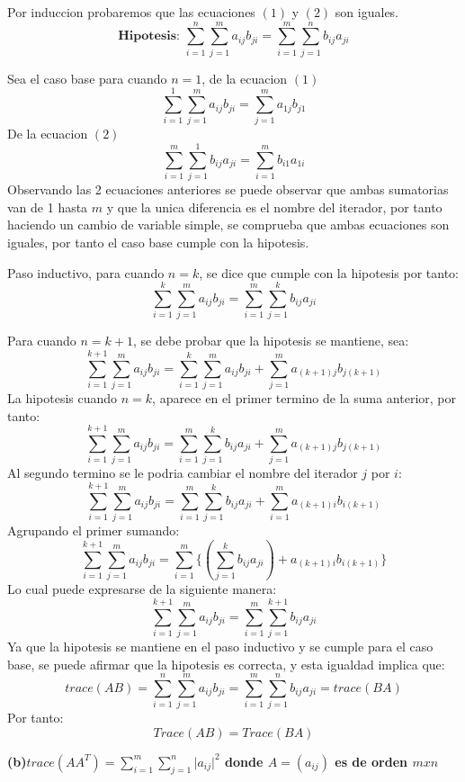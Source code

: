 \documentclass[12pt]{article}
\begin{document}
    Por induccion probaremos que las ecuaciones $(1)$ y $(2)$ son iguales.
    \[\textbf{Hipotesis: }\sum_{i=1}^n\sum_{j=1}^m a_{ij}b_{ji} = \sum_{i=1}^m\sum_{j=1}^n b_{ij}a_{ji}\]
    
    Sea el caso base para cuando $n = 1$, de la ecuacion $(1)$
    \[
    	\sum_{i=1}^1\sum_{j=1}^m a_{ij}b_{ji} = \sum_{j=1}^m a_{1j}b_{j1}  
    \]
    De la ecuacion $(2)$
    \[
    	\sum_{i=1}^m\sum_{j=1}^1 b_{ij}a_{ji} = \sum_{i=1}^m b_{i1}a_{1i}
    \]
    Observando las 2 ecuaciones anteriores se puede observar que ambas sumatorias van de 1 hasta $m$ y que la unica diferencia es el nombre del iterador, por tanto haciendo un cambio de variable simple, se comprueba que ambas ecuaciones son iguales, por tanto el caso base cumple con la hipotesis.
    
    
    Paso inductivo, para cuando $n = k$, se dice que cumple con la hipotesis por tanto:
    \[
    	\sum_{i=1}^k\sum_{j=1}^m a_{ij}b_{ji} = \sum_{i=1}^m\sum_{j=1}^k b_{ij}a_{ji}
    \]
    
    Para cuando $n = k+1$, se debe probar que la hipotesis se mantiene, sea:
    \[
    	\sum_{i=1}^{k+1}\sum_{j=1}^m a_{ij}b_{ji} = \sum_{i=1}^{k}\sum_{j=1}^m a_{ij}b_{ji} + \sum_{j=1}^m a_{(k+1)j}b_{j(k+1)}  
    \]
    La hipotesis cuando $n=k$, aparece en el primer termino de la suma anterior, por tanto:
    \[
    	\sum_{i=1}^{k+1}\sum_{j=1}^m a_{ij}b_{ji} = \sum_{i=1}^m\sum_{j=1}^k b_{ij}a_{ji} + \sum_{j=1}^m a_{(k+1)j}b_{j(k+1)}  
    \]
    Al segundo termino se le podria cambiar el nombre del iterador $j$ por $i$:
    \[
    	\sum_{i=1}^{k+1}\sum_{j=1}^m a_{ij}b_{ji} = \sum_{i=1}^m\sum_{j=1}^k b_{ij}a_{ji} + \sum_{i=1}^m a_{(k+1)i}b_{i(k+1)}  
    \]
    Agrupando el primer sumando:
    \[
    	\sum_{i=1}^{k+1}\sum_{j=1}^m a_{ij}b_{ji} = \sum_{i=1}^m \{(\sum_{j=1}^k b_{ij}a_{ji})  + a_{(k+1)i}b_{i(k+1)}\}  
    \]
    Lo cual puede expresarse de la siguiente manera:
    \[
    	\sum_{i=1}^{k+1}\sum_{j=1}^m a_{ij}b_{ji} = \sum_{i=1}^m\sum_{j=1}^{k+1} b_{ij}a_{ji}
    \]
    Ya que la hipotesis se mantiene en el paso inductivo y se cumple para el caso base, se puede afirmar que la hipotesis es correcta, y esta igualdad implica que:
    \[
    	trace(AB) = \sum_{i=1}^n\sum_{j=1}^m a_{ij}b_{ji} = \sum_{i=1}^m\sum_{j=1}^n b_{ij}a_{ji} = trace(BA)
    \]
    Por tanto: 
    \[
    	Trace(AB) = Trace(BA)
    \]

    \textbf{(b)\quad $trace(AA^{T}) =  \sum_{i=1}^m\sum_{j=1}^n {\vert{a_{ij}}\vert}^2$ donde $ A = (a_{ij})$ es de orden $mxn$}
    
\end{document}
